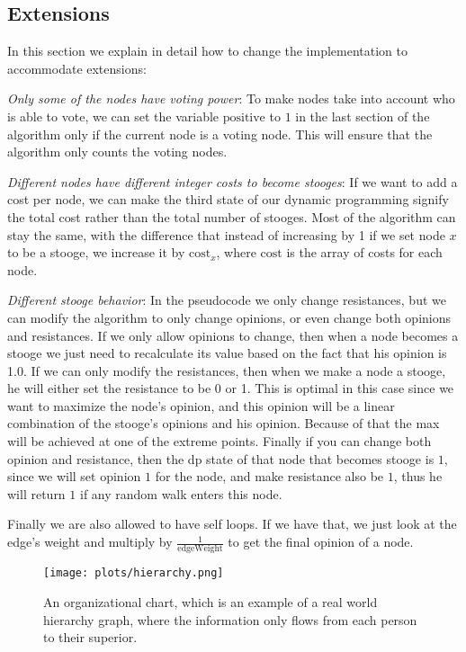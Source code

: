 \subsection{Extensions}

In this section we explain in detail how to change the implementation to accommodate extensions:

\textit{Only some of the nodes have voting power}: To make nodes take into account who is able to vote, we can set the variable $\text{positive}$ to $1$ in the last section of the algorithm only if the current node is a voting node. This will ensure that the algorithm only counts the voting nodes.

\textit{Different nodes have different integer costs to become stooges}: If we want to add a cost per node, we can make the third state of our dynamic programming signify the total cost rather than the total number of stooges. Most of the algorithm can stay the same, with the difference that instead of increasing by 1 if we set node $x$ to be a stooge, we increase it by $\text{cost}_x$, where $\text{cost}$ is the array of costs for each node.

\textit{Different stooge behavior}: In the pseudocode we only change resistances, but we can modify the algorithm to only change opinions, or even change both opinions and resistances. If we only allow opinions to change, then when a node becomes a stooge we just need to recalculate its value based on the fact that his opinion is 1.0. If we can only modify the resistances, then when we make a node a stooge, he will either set the resistance to be 0 or 1. This is optimal in this case since we want to maximize the node's opinion, and this opinion will be a linear combination of the stooge's opinions and his opinion. Because of that the max will be achieved at one of the extreme points. Finally if you can change both opinion and resistance, then the dp state of that node that becomes stooge is $1$, since we will set opinion $1$ for the node, and make resistance also be $1$, thus he will return $1$ if any random walk enters this node.

Finally we are also allowed to have self loops. If we have that, we just look at the edge's weight and multiply by $\frac{1}{\text{edgeWeight}}$ to get the final opinion of a node.

\begin{figure}
    \centering
    \texttt{[image: plots/hierarchy.png]}
    \figsp
    \caption{An organizational chart, which is an example of a real world hierarchy graph, where the information only flows from each person to their superior.}
    \label{fig:org-chart}
\end{figure}

